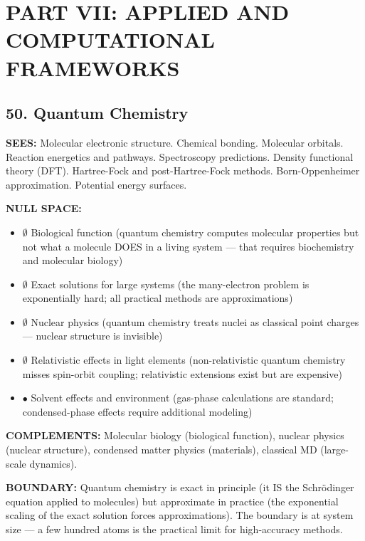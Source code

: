 \bigskip\noindent\makebox[\textwidth]{\color{rulegray}\rule{5cm}{0.3pt}}\bigskip


\section*{PART VII: APPLIED AND COMPUTATIONAL FRAMEWORKS}


\subsection*{50. Quantum Chemistry}


\textbf{SEES:} Molecular electronic structure. Chemical bonding. Molecular orbitals. Reaction energetics and pathways. Spectroscopy predictions. Density functional theory (DFT). Hartree-Fock and post-Hartree-Fock methods. Born-Oppenheimer approximation. Potential energy surfaces.


\textbf{NULL SPACE:}

\begin{itemize}[nosep,leftmargin=*]
  \item $\emptyset$ Biological function (quantum chemistry computes molecular properties but not what a molecule DOES in a living system — that requires biochemistry and molecular biology)
  \item $\emptyset$ Exact solutions for large systems (the many-electron problem is exponentially hard; all practical methods are approximations)
  \item $\emptyset$ Nuclear physics (quantum chemistry treats nuclei as classical point charges — nuclear structure is invisible)
  \item $\emptyset$ Relativistic effects in light elements (non-relativistic quantum chemistry misses spin-orbit coupling; relativistic extensions exist but are expensive)
  \item $\bullet$ Solvent effects and environment (gas-phase calculations are standard; condensed-phase effects require additional modeling)
\end{itemize}


\textbf{COMPLEMENTS:} Molecular biology (biological function), nuclear physics (nuclear structure), condensed matter physics (materials), classical MD (large-scale dynamics).


\textbf{BOUNDARY:} Quantum chemistry is exact in principle (it IS the Schrödinger equation applied to molecules) but approximate in practice (the exponential scaling of the exact solution forces approximations). The boundary is at system size — a few hundred atoms is the practical limit for high-accuracy methods.


